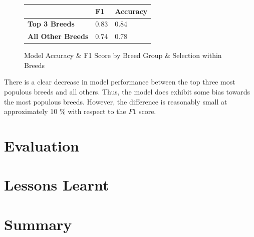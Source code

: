 \documentclass{article}
\begin{document}
\begin{figure}[]

\begin{center}

\begin{tabular}{|l|l|l|}
\hline
                          & \textbf{F1} & \textbf{Accuracy} \\ \hline
\textbf{Top 3 Breeds}     & 0.83        & 0.84              \\ \hline
\textbf{All Other Breeds} & 0.74        & 0.78              \\ \hline
\end{tabular}
\end{center}
\caption{Model Accuracy \& F1 Score by Breed Group & Selection within Breeds}
\label{fig:x breed score in breed}
\end{figure}

\noident  There is a clear decrease in model performance between the top three most populous breeds and all others.  Thus, the model does exhibit some bias towards the most populous breeds.  However, the difference is reasonably small at approximately 10 \% with respect to the $F1$ score.



\section{Evaluation}

\section{Lessons Learnt}

\section{Summary}

\newpage



\end{document}
